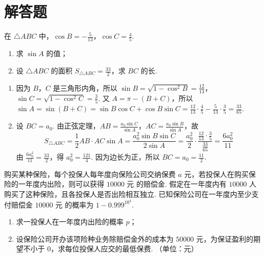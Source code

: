\section{解答题}

\begin{problem}
在 \(\triangle ABC\) 中，\(\cos B = -\frac{5}{13}\)，\(\cos C = \frac{4}{5}\).

\begin{enumerate}
\item 求 \(\sin A\) 的值；
\item 设 \(\triangle ABC\) 的面积 \(S_{\triangle ABC} = \frac{33}{2}\)，求 \(BC\) 的长.
\end{enumerate}
\end{problem}

\begin{solution}
\begin{enumerate}
\item 因为 \(B\)，\(C\) 是三角形内角，所以 \(\sin B=\sqrt{1-\cos^2B}=\frac{12}{13}\)，\(\sin C=\sqrt{1-\cos^2C}=\frac35\). 又 \(A=\pi-(B+C)\)，所以 \(\sin A=\sin(B+C)=\sin B\cos C+\cos B\sin C=\frac{12}{13}\cdot\frac45-\frac5{13}\cdot\frac35=\frac{33}{65}\).
\item 设 \(BC=a_0\). 由正弦定理，\(AB=\frac{a_0\sin C}{\sin A}\)，\(AC=\frac{a_0\sin B}{\sin A}\)，故
\[
S_{\triangle ABC}=\frac12 AB\cdot AC\sin A=\frac{a_0^2\sin B\sin C}{2\sin A}=\frac{a_0^2}{2}\cdot\frac{\frac{12}{13}\cdot\frac35}{\frac{33}{65}}=\frac{6a_0^2}{11}
\]
由 \(\frac{6a_0^2}{11}=\frac{33}{2}\)，得 \(a_0^2=\frac{121}{4}\). 因为边长为正，所以 \(BC=a_0=\frac{11}{2}\).
\end{enumerate}
\end{solution}

\begin{problem}
购买某种保险，每个投保人每年度向保险公司交纳保费 \(a\text{ 元}\)，若投保人在购买保险的一年度内出险，则可以获得 \(10000\text{ 元}\) 的赔偿金. 假定在一年度内有 \(10000\text{ 人}\) 购买了这种保险，且各投保人是否出险相互独立. 已知保险公司在一年度内至少支付赔偿金 \(10000\text{ 元}\) 的概率为 \(1 - 0.999^{10^{4}}\).

\begin{enumerate}
\item 求一投保人在一年度内出险的概率 \(p\)；
\item 设保险公司开办该项险种业务除赔偿金外的成本为 \(50000\text{ 元}\)，为保证盈利的期望不小于 0，求每位投保人应交的最低保费. （单位：元）
\end{enumerate}
\end{problem}


